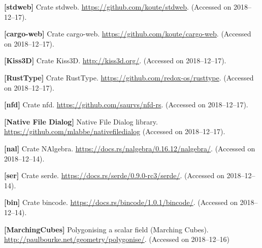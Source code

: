 \documentclass{article}
\begin{document}
\textbf{[stdweb]}\label{ref:stdweb}
Crate stdweb. \url{https://github.com/koute/stdweb}. (Accessed on 2018--12--17).

\textbf{[cargo-web]}\label{ref:cargo-web}
Crate cargo-web. \url{https://github.com/koute/cargo-web}. (Accessed on 2018--12--17).

\textbf{[Kiss3D]}\label{ref:Kiss3D}
Crate Kiss3D. \url{http://kiss3d.org/}. (Accessed on 2018--12--17).

\textbf{[RustType]}\label{ref:RustType}
Crate RustType. \url{https://github.com/redox-os/rusttype}. (Accessed on 2018--12--17).

\textbf{[nfd]}\label{ref:nfd}
Crate nfd. \url{https://github.com/saurvs/nfd-rs}. (Accessed on 2018--12--17).

\textbf{[Native File Dialog]}\label{ref:Native File Dialog}
Native File Dialog library. \url{https://github.com/mlabbe/nativefiledialog} (Accessed on 2018--12--17).

\textbf{[nal]}\label{ref:nal}
Crate NAlgebra. \url{https://docs.rs/nalgebra/0.16.12/nalgebra/}. (Accessed on 2018--12--14).

\textbf{[ser]}\label{ref:ser}
Crate serde. \url{https://docs.rs/serde/0.9.0-rc3/serde/}. (Accessed on 2018--12--14).

\textbf{[bin]}\label{ref:bin}
Crate bincode. \url{https://docs.rs/bincode/1.0.1/bincode/}. (Accessed on 2018--12--14).

\textbf{[MarchingCubes]}\label{ref:MarchingCubes}
Polygonising a scalar field (Marching Cubes). \url{http://paulbourke.net/geometry/polygonise/}. (Accessed on 2018--12--16)
\end{document}
